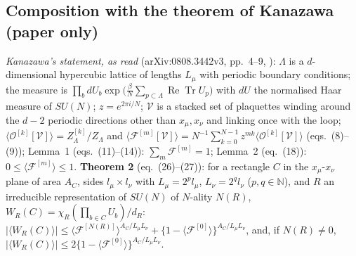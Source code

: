 \documentclass[11pt,a4paper]{article}
\theoremstyle{plain}
\theoremstyle{definition}
\theoremstyle{remark}
\numberwithin{equation}{section}
\begin{document}
\subsection{Composition with the theorem of Kanazawa (paper only)}
\emph{Kanazawa's statement, as read} (arXiv:0808.3442v3, pp.~4--9, \cite{Kan}): $\Lambda$ is a $d$-dimensional hypercubic lattice of lengths $L_\mu$ with periodic boundary conditions; the measure is $\prod_b dU_b\exp\bigl(\tfrac\beta N\sum_{p\subset\Lambda}\operatorname{Re}\operatorname{Tr}U_p\bigr)$ with $dU$ the normalised Haar measure of $SU(N)$; $z=e^{2\pi i/N}$; $\mathcal V$ is a stacked set of plaquettes winding around the $d-2$ periodic directions other than $x_\mu,x_\nu$ and linking once with the loop; $\langle\mathcal O^{[k]}[\mathcal V]\rangle=Z^{[k]}_\Lambda/Z_\Lambda$ and $\langle\mathcal F^{[m]}[\mathcal V]\rangle=N^{-1}\sum_{k=0}^{N-1}z^{mk}\langle\mathcal O^{[k]}[\mathcal V]\rangle$ (eqs.~(8)--(9)); Lemma~1 (eqs.~(11)--(14)): $\sum_m\mathcal F^{[m]}=1$; Lemma~2 (eq.~(18)): $0\le\langle\mathcal F^{[m]}\rangle\le1$. \textbf{Theorem 2} (eq.~(26)--(27)): for a rectangle $C$ in the $x_\mu$-$x_\nu$ plane of area $A_C$, sides $l_\mu\times l_\nu$ with $L_\mu=2^pl_\mu$, $L_\nu=2^ql_\nu$ ($p,q\in\mathbb N$), and $R$ an irreducible representation of $SU(N)$ of $N$-ality $N(R)$, $W_R(C)=\chi_R(\prod_{b\in C}U_b)/d_R$: $|\langle W_R(C)\rangle|\le\langle\mathcal F^{[N(R)]}\rangle^{A_C/L_\mu L_\nu}+\{1-\langle\mathcal F^{[0]}\rangle\}^{A_C/L_\mu L_\nu}$, and, if $N(R)\ne0$, $|\langle W_R(C)\rangle|\le2\{1-\langle\mathcal F^{[0]}\rangle\}^{A_C/L_\mu L_\nu}$.
\end{document}
